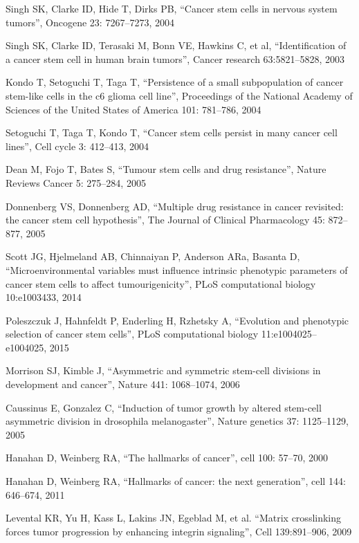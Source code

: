 \begin{thebibliography}{}
 Singh SK, Clarke ID, Hide T, Dirks PB, 
``Cancer stem cells in nervous system tumors'', 
Oncogene 23: 7267–7273,  2004

 Singh SK, Clarke ID, Terasaki M, Bonn VE, Hawkins C, et al, 
``Identification of a cancer stem cell in human brain tumors'', 
Cancer research 63:5821–5828,  2003 

 Kondo T, Setoguchi T, Taga T, 
``Persistence of a small subpopulation of cancer stem-like cells in the c6 glioma cell line'', 
Proceedings of the National Academy of Sciences of the United States of America 101: 781–786, 2004

 Setoguchi T, Taga T, Kondo T, 
``Cancer stem cells persist in many cancer cell lines'', 
Cell cycle 3: 412–413, 2004

 Dean M, Fojo T, Bates S, 
``Tumour stem cells and drug resistance'',  
Nature Reviews Cancer 5: 275–284, 2005 

 Donnenberg VS, Donnenberg AD, 
``Multiple drug resistance in cancer revisited: the cancer stem cell hypothesis'', 
The Journal of Clinical Pharmacology 45: 872–877, 2005

 Scott JG, Hjelmeland AB, Chinnaiyan P, Anderson ARa, Basanta D, 
``Microenvironmental variables must influence intrinsic phenotypic parameters of cancer stem cells to affect tumourigenicity'', 
PLoS computational biology 10:e1003433, 2014 

 Poleszczuk J, Hahnfeldt P, Enderling H, Rzhetsky A, 
``Evolution and phenotypic selection of cancer stem cells'', 
PLoS computational biology 11:e1004025–e1004025, 2015

 Morrison SJ, Kimble J, 
``Asymmetric and symmetric stem-cell divisions in development and cancer'', 
Nature 441: 1068–1074, 2006

 Caussinus E, Gonzalez C, 
``Induction of tumor growth by altered stem-cell asymmetric division in drosophila melanogaster'', 
Nature genetics 37: 1125–1129, 2005

 Hanahan D, Weinberg RA, 
``The hallmarks of cancer'', 
cell 100: 57–70, 2000 

 Hanahan D, Weinberg RA, 
``Hallmarks of cancer: the next generation'', 
cell 144: 646–674, 2011

 Levental KR, Yu H, Kass L, Lakins JN, Egeblad M, et al. 
``Matrix crosslinking forces tumor progression by enhancing integrin signaling'', 
Cell 139:891–906, 2009 


\end{thebibliography}
